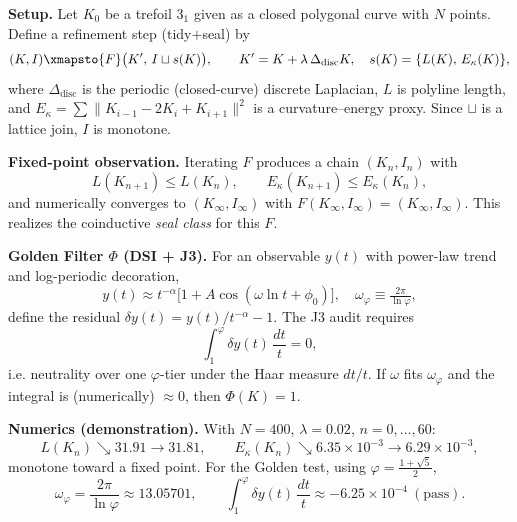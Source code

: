 \documentclass[10pt,reprint,aps,onecolumn,nofootinbib]{revtex4-2}
\begin{document}
            \noindent
            \textbf{Setup.} Let \(K_0\) be a trefoil \(3_1\) given as a closed polygonal curve with \(N\) points.
            Define a refinement step (tidy\(+\)seal) by
            \[
                (K,I) \xmapsto{F} \bigl(K',\, I \sqcup s(K)\bigr),\qquad
                K' = K + \lambda\,\Delta_{\text{disc}}K,\quad
                s(K)=\{L(K),\,E_\kappa(K)\},
            \]
            where \(\Delta_{\text{disc}}\) is the periodic (closed-curve) discrete Laplacian,
            \(L\) is polyline length, and \(E_\kappa=\sum \lVert K_{i-1}-2K_i+K_{i+1}\rVert^2\) is a curvature–energy proxy.
            Since \(\sqcup\) is a lattice join, \(I\) is monotone.

            \medskip
            \noindent
            \textbf{Fixed-point observation.} Iterating \(F\) produces a chain \((K_n,I_n)\) with
            \[
                L(K_{n+1})\le L(K_n),\qquad E_\kappa(K_{n+1})\le E_\kappa(K_n),
            \]
            and numerically converges to \((K_\infty,I_\infty)\) with
            \(F(K_\infty,I_\infty)=(K_\infty,I_\infty)\). This realizes the coinductive
            \emph{seal class} for this \(F\).

            \medskip
            \noindent
            \textbf{Golden Filter \(\Phi\) (DSI + J3).} For an observable \(y(t)\) with power-law trend
            and log-periodic decoration,
            \[
                y(t)\approx t^{-\alpha}\bigl[1+A\cos(\omega\ln t+\phi_0)\bigr],
                \quad
                \omega_\varphi \equiv \tfrac{2\pi}{\ln\varphi},
            \]
            define the residual \(\delta y(t) = y(t)/t^{-\alpha}-1\).
            The J3 audit requires
            \[
                \int_{1}^{\varphi}\delta y(t)\,\frac{dt}{t}=0,
            \]
            i.e. neutrality over one \(\varphi\)-tier under the Haar measure \(dt/t\).
            If \(\omega\) fits \(\omega_\varphi\) and the integral is (numerically) \(\approx 0\), then \(\Phi(K)=1\).

            \medskip
            \noindent
            \textbf{Numerics (demonstration).}
            With \(N=400\), \(\lambda=0.02\), \(n=0,\dots,60\):
            \[
                L(K_n)\searrow 31.91\rightarrow 31.81,\qquad
                E_\kappa(K_n)\searrow 6.35\!\times\!10^{-3}\rightarrow 6.29\!\times\!10^{-3},
            \]
            monotone toward a fixed point.
            For the Golden test, using \(\varphi=\tfrac{1+\sqrt{5}}{2}\),
            \[
                \omega_\varphi=\frac{2\pi}{\ln\varphi}\approx 13.05701,
                \qquad
                \int_{1}^{\varphi}\delta y(t)\,\frac{dt}{t}\approx -6.25\times10^{-4}\ (\text{pass}).
            \]
\end{document}

